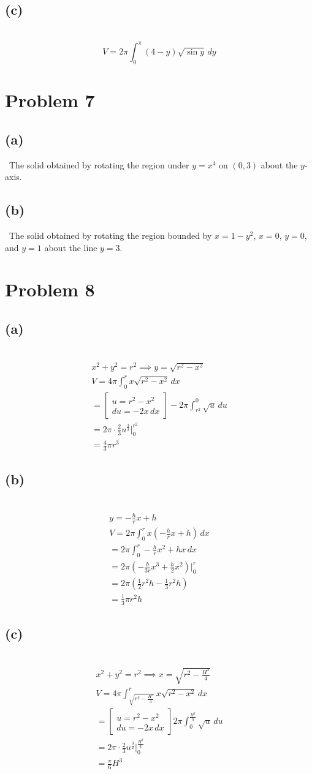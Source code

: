 \documentclass[12pt]{article}
\newcommand{\vem}{\vspace{0.5em}}
\newcommand{\problem}[1]{\section{Problem #1}}
\newcommand{\subproblem}[1]{\subsection{(#1)} \,}
\begin{document}
\subproblem{c}
\[
\boxed{V=2\pi \int_0^\pi (4-y)\sqrt{\sin y}\, dy}
\]

\problem{7}

\subproblem{a}
The solid obtained by rotating the region under $y=x^4$ on $(0,3)$ about the $y$-axis.\vem

\subproblem{b}
The solid obtained by rotating the region bounded by $x=1-y^2$, $x=0$, $y=0$, and $y=1$ about the line $y=3$.

\problem{8}

\subproblem{a}
\begin{gather*}
    x^2+y^2=r^2\implies y=\sqrt{r^2-x^2}\\
    V=4\pi \int_0^r x\sqrt{r^2-x^2}\, dx\\
    = \begin{bmatrix}
        u=r^2-x^2\\
        du=-2x\, dx
    \end{bmatrix} -2\pi \int_{r^2}^0 \sqrt{u}\, du\\
    = 2\pi \cdot \frac{2}{3}u^\frac{3}{2} \Big|_0^{r^2}\\
    =\boxed{\frac{4}{3}\pi r^3}
\end{gather*}

\subproblem{b}
\begin{gather*}
    y=-\frac{h}{r}x+h\\
    V=2\pi \int_0^r x(-\frac{h}{r}x+h)\, dx\\
    = 2\pi \int_0^r -\frac{h}{r}x^2+hx\, dx\\
    =2\pi (-\frac{h}{3r}x^3+\frac{h}{2}x^2)\Big|_0^r\\
    =2\pi(\frac{1}{2}r^2h - \frac{1}{3}r^2h)\\
    = \boxed{\frac{1}{3}\pi r^2h}
\end{gather*}

\subproblem{c}
\begin{gather*}
    x^2+y^2=r^2\implies x=\sqrt{r^2-\frac{H^2}{4}}\\
    V=4\pi \int_{\sqrt{r^2-\frac{H^2}{4}}}^rx\sqrt{r^2-x^2} \, dx\\
     = \begin{bmatrix}
        u=r^2-x^2\\
        du=-2x\, dx
    \end{bmatrix} 2\pi \int_{0}^{\frac{H^2}{4}} \sqrt{u}\, du\\
    = 2\pi \cdot \frac{2}{3}u^\frac{3}{2}\Big|_{0}^{\frac{H^2}{4}} \\
    = \boxed{\frac{\pi}{6} H^3}
\end{gather*}
\end{document}
